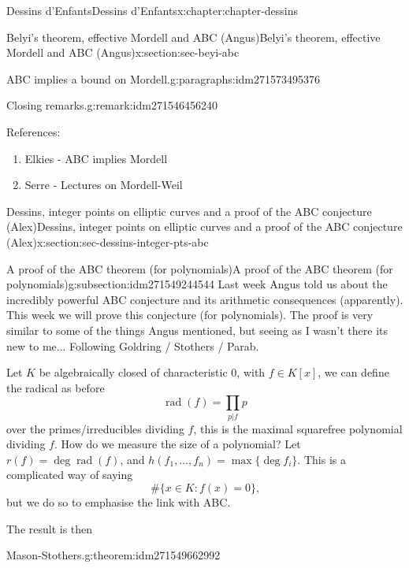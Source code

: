 \documentclass[oneside,10pt,]{book}
\numberwithin{equation}{section}
\newcommand{\lb}{[}
\newcommand{\rb}{]}
\begin{document}
\begin{chapterptx}{Dessins d'Enfants}{}{Dessins d'Enfants}{}{}{x:chapter:chapter-dessins}
\begin{sectionptx}{Belyi's theorem, effective Mordell and ABC (Angus)}{}{Belyi's theorem, effective Mordell and ABC (Angus)}{}{}{x:section:sec-beyi-abc}
\begin{paragraphs}{ABC implies a bound on Mordell.}{g:paragraphs:idm271573495376}
\begin{remark}{Closing remarks.}{g:remark:idm271546456240}
\end{remark}
References:%
\begin{enumerate}
\item{}Elkies - ABC implies Mordell%
\item{}Serre - Lectures on Mordell-Weil%
\end{enumerate}
%
\end{paragraphs}%
\end{sectionptx}
%
%
\typeout{************************************************}
\typeout{************************************************}
%
\begin{sectionptx}{Dessins, integer points on elliptic curves and a proof of the ABC conjecture (Alex)}{}{Dessins, integer points on elliptic curves and a proof of the ABC conjecture (Alex)}{}{}{x:section:sec-dessins-integer-pts-abc}
%
%
\typeout{************************************************}
\typeout{************************************************}
%
\begin{subsectionptx}{A proof of the ABC theorem (for polynomials)}{}{A proof of the ABC theorem (for polynomials)}{}{}{g:subsection:idm271549244544}
Last week Angus told us about the incredibly powerful ABC conjecture and its arithmetic consequences (apparently). This week we will prove this conjecture (for polynomials). The proof is very similar to some of the things Angus mentioned, but seeing as I wasn't there its new to me... Following Goldring \slash{} Stothers \slash{} Parab.%
\par
Let \(K\) be algebraically closed of characteristic 0, with \(f \in K\lb x \rb\), we can define the radical as before%
\begin{equation*}
\operatorname{rad}(f) = \prod_{p | f} p
\end{equation*}
over the primes\slash{}irreducibles dividing \(f\), this is the maximal squarefree polynomial dividing \(f\). How do we measure the size of a polynomial? Let \(r(f) = \deg \operatorname{rad}(f)\), and \(h(f_1, \ldots, f_n) = \max\{\deg f_i\}\). This is a complicated way of saying%
\begin{equation*}
\#\{x \in K : f(x) = 0 \}\text{,}
\end{equation*}
but we do so to emphasise the link with ABC.%
\par
The result is then%
\begin{theorem}{Mason-Stothers.}{}{g:theorem:idm271549662992}%

\end{theorem}
\end{subsectionptx}
\end{sectionptx}
\end{chapterptx}
\end{document}
